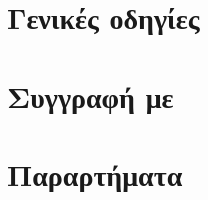 \documentclass{kalliposstd}
\begin{document}

\frontmatter %
\tableofcontents
\listoffigures
\listoftables





\mainmatter %
\part{Γενικές οδηγίες}





\part{Συγγραφή με \XeLaTeX}




\part{Παραρτήματα}
\appendix





\end{document}
